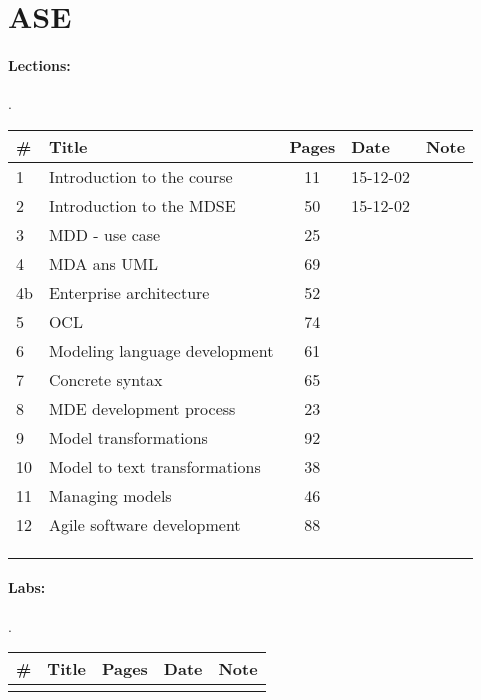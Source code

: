 \documentclass[a4paper,12pt]{article} %
\begin{document}
\newpage
\section{ASE}
\paragraph{Lections:} .\\
\begin{tabularx}{\textwidth}{|l|X|c|l|c|}
	\hline
	\# & Title & Pages & Date & Note \\
	\hline
	1 & Introduction to the course & 11 & 15-12-02 &  \\
	\hline
	2 & Introduction to the MDSE & 50 & 15-12-02 &  \\
	\hline
	3 & MDD - use case & 25 &  &  \\
	\hline
	4 & MDA ans UML & 69 &  &  \\
	\hline
	4b & Enterprise architecture & 52 &  &  \\
	\hline
	5 & OCL & 74 &  &  \\
	\hline
	6 & Modeling language development & 61 &  &  \\
	\hline
	7 & Concrete syntax & 65 &  &  \\
	\hline
	8 & MDE development process & 23 &  &  \\
	\hline
	9 & Model transformations & 92 &  &  \\
	\hline
	10 & Model to text transformations & 38 &  &  \\
	\hline
	11 & Managing models & 46 &  &  \\
	\hline
	12 & Agile software development & 88 &  &  \\
	\hline
	&  &  &  &  \\
	\hline
	&  &  &  &  \\
	\hline
	&  &  &  &  \\
	\hline
\end{tabularx}

\paragraph{Labs:}.\\
\begin{tabularx}{\textwidth}{|l|X|c|l|c|}
	\hline
	\# & Title & Pages & Date & Note \\
	\hline
	&  &  &  &  \\
	\hline
\end{tabularx}
\end{document}
